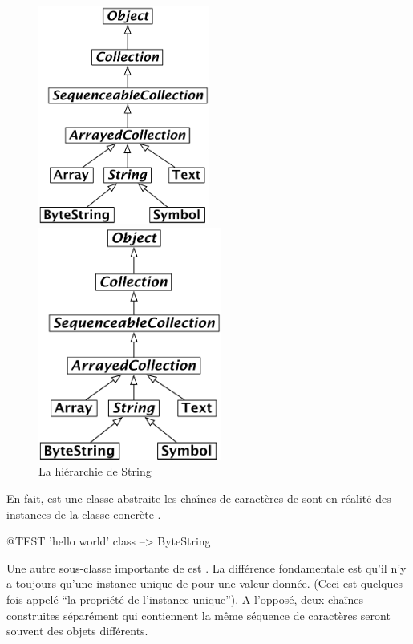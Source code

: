\documentclass[a4paper,10pt,twoside]{book}
\begin{document}
\begin{figure}[ht]
\ifluluelse
	{\centerline {\includegraphics[width=0.5\textwidth]{StringHierarchy}}}
	{\centerline {\includegraphics[width=6cm]{StringHierarchy}}}
\caption{La hi\'erarchie de String \label{fig:strings}}
\end{figure}

En fait,  est une classe abstraite les cha\^ines de caract\`eres de \sq sont en r\'ealit\'e des instances de la classe concr\`ete .

\begin{code}{@TEST}
'hello world' class --> ByteString
\end{code}

Une autre sous-classe importante de  est .  La diff\'erence fondamentale est qu'il n'y a toujours qu'une instance unique de  pour une valeur donn\'ee.  (Ceci est quelques fois appel\'e ``la propri\'et\'e de l'instance unique'').  A l'oppos\'e, deux cha\^ines construites s\'epar\'ement  qui contiennent la m\^eme s\'equence de caract\`eres seront souvent des objets diff\'erents.
\end{document}
